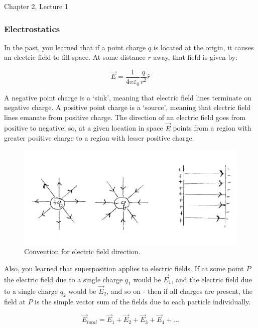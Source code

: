 \documentclass[12pt]{article}
\begin{document}
\begin{flushright} {\color{blue} Chapter 2, Lecture 1} \end{flushright}
\begin{flushleft}

\subsubsection*{\bf Electrostatics}

In the past, you learned that if a point charge $q$ is located at the origin, it causes an electric field to fill space.  At some distance $r$ away, that field is given by:

\begin{equation}
\vec{E} =\frac{1}{4\pi \varepsilon_{0}}\frac{q}{r^{2}}\hat{r}
\label{eq:coulomb}
\end{equation}

A negative point charge is a `sink', meaning that electric field lines terminate on negative charge.  A positive point charge is a `source', meaning that electric field lines emanate from positive charge.  The direction of an  electric field goes from positive to negative; so, at a given location in space $\vec{E}$ points from a region with greater positive charge to a region with lesser positive charge.

\begin{figure}[h]
\centering
\includegraphics*[trim=0cm .5cm 0cm 0cm, clip=true, width=0.4\columnwidth]{fielddirs.png}
\caption{Convention for electric field direction.}
\label{fig:scriptr}
\end{figure}

Also, you learned that superposition applies to electric fields.  If at some point $P$ the electric field due to a single charge $q_{1}$ would be $\vec{E}_{1}$, and the electric field due to a single charge $q_{2}$ would be $\vec{E}_{2}$, and so on - then if all charges are present, the field at $P$ is the simple vector sum of the fields due to each particle individually.

\begin{equation}
\vec{E}_{total} = \vec{E}_{1} + \vec{E}_{2} + \vec{E}_{3} + \vec{E}_{4} + \ldots
\label{eq:superposition}
\end{equation}


\end{flushleft}
\end{document}
